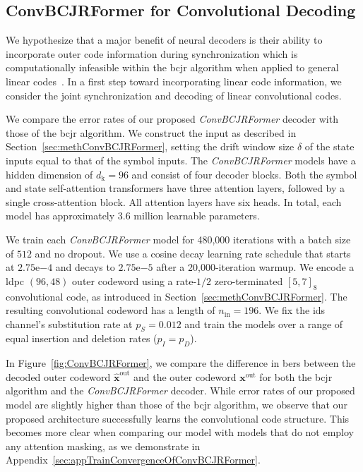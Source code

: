 \documentclass[conference,letterpaperu]{IEEEtran}
\newcommand{\expnumber}[2]{{#1}\mathrm{e}{#2}}
\newcommand{\pdel}{\ensuremath{p_D}}
\newcommand{\pins}{\ensuremath{p_I}}
\newcommand{\psub}{\ensuremath{p_S}}
\newcommand{\yout}{\ensuremath{\bm{x}^{\text{out}}}}
\newcommand{\nin}{\ensuremath{n_{\text{in}}}}
\newcommand{\predyout}{\ensuremath{\bm{\hat{x}}^{\text{out}}}}
\newcommand{\hiddenDim}{\ensuremath{d_{\text{k}}}}
\begin{document}
\subsection{ConvBCJRFormer for Convolutional Decoding}
\label{sec:ExpConvBCJRFormer}
We hypothesize that a major benefit of neural decoders is their ability to incorporate outer code information during synchronization which is computationally infeasible within the \ac{bcjr} algorithm when applied to general linear codes~\cite{bahlOptimalDecodingLinear1974}. In a first step toward incorporating linear code information, we consider the joint synchronization and decoding of linear convolutional codes. 

We compare the error rates of our proposed \textit{ConvBCJRFormer} decoder with those of the \ac{bcjr} algorithm. We construct the input as described in Section~\ref{sec:methConvBCJRFormer}, setting the drift window size $\delta$ of the state inputs equal to that of the symbol inputs. The \mbox{\textit{ConvBCJRFormer}} models have a hidden dimension of $\hiddenDim = 96$ and consist of four decoder blocks. Both the symbol and state self-attention transformers have three attention layers, followed by a single cross-attention block. All attention layers have six heads. In total, each model has approximately $3.6$ million learnable parameters. 

We train each \textit{ConvBCJRFormer} model for 480{,}000 iterations with a batch size of $512$ and no dropout. We use a cosine decay learning rate schedule that starts at $\expnumber{2.75}{-4}$ and decays to $\expnumber{2.75}{-5}$ after a 20{,}000-iteration warmup. We encode a \ac{ldpc} $(96, 48)$ outer codeword using a rate-$1/2$ zero-terminated $[5, 7]_8$ convolutional code, as introduced in Section~\ref{sec:methConvBCJRFormer}. The resulting convolutional codeword has a length of $\nin = 196$. We fix the \ac{ids} channel's substitution rate at $\psub = 0.012$ and train the models over a range of equal insertion and deletion rates ($\pins = \pdel$). 

In Figure~\ref{fig:ConvBCJRFormer}, we compare the difference in \acp{ber} between the decoded outer codeword $\predyout$ and the outer codeword $\yout$ for both the \ac{bcjr} algorithm and the \mbox{\textit{ConvBCJRFormer}} decoder. While error rates of our proposed model are slightly higher than those of the \ac{bcjr} algorithm, we observe that our proposed architecture successfully learns the convolutional code structure. This becomes more clear when comparing our model with models that do not employ any attention masking, as we demonstrate in Appendix~\ref{sec:appTrainConvergenceOfConvBCJRFormer}.
\end{document}
